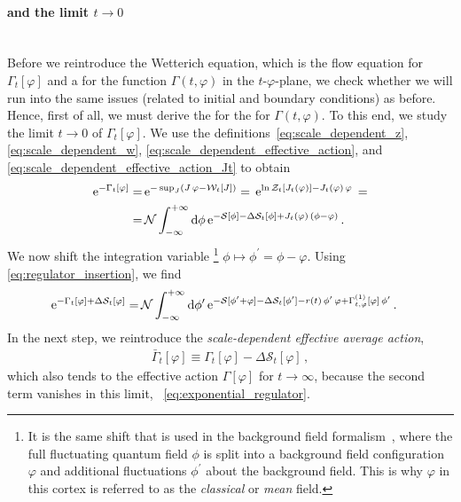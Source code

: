 \paragraph{\ic{} and the \uv{} limit $t\rightarrow 0$}\mbox{}\label{subsubsec:zerodICS} \\
Before we reintroduce the Wetterich equation, which is the flow equation for $\Gamma_t [ \varphi ]$ and a \pde{} for the function $\Gamma ( t, \varphi )$ in the $t$-$\varphi$-plane, we check whether we will run into the same issues (related to initial and boundary conditions) as before.
Hence, first of all, we must derive the \ic{} for the \pde{} for $\Gamma ( t, \varphi )$.
To this end, we study the limit $t \rightarrow 0$ of $\Gamma_t [ \varphi ]$.
We use the definitions~\eqref{eq:scale_dependent_z}, \eqref{eq:scale_dependent_w}, \eqref{eq:scale_dependent_effective_action}, and \eqref{eq:scale_dependent_effective_action_Jt} to obtain
\begin{subequations}\label{eq:derivation_uv_condition}
\begin{align}
	\eu^{ - \Gamma_t [ \varphi ] } = \, & \eu^{ - \mathop{\mathrm{sup}}_J ( J \, \varphi - \mathcal{W}_t [ J ] ) } =\, \eu^{ \ln \mathcal{Z}_t [ J_t ( \varphi )] - J_t ( \varphi ) \, \varphi }\, =
	\\* %
	= \, & \mathcal{N} \int_{-\infty}^{+\infty} \dif \phi \, \eu^{ - \mathcal{S} [ \phi ] - \Delta \mathcal{S}_t [ \phi ] + J_t ( \varphi ) \, ( \phi - \varphi ) } \, .
\end{align}
\end{subequations}
We now shift the integration variable%
\footnote{%
	It is the same shift that is used in the background field formalism~\cite{DeWitt:1965jb,Abbott:1981ke}, where the full fluctuating quantum field $\phi$ is split into a background field configuration $\varphi$ and additional fluctuations $\phi^\prime$ about the background field.
	This is why $\varphi$ in this cortex is referred to as the \textit{classical} or \textit{mean} field.
}
$\phi \mapsto \phi^\prime = \phi - \varphi$. Using \cref{eq:regulator_insertion}, we find
\begin{align}
	\eu^{- \Gamma_t [ \varphi ] + \Delta \mathcal{S}_t [ \varphi ]} =	 \, & \mathcal{N} \int_{-\infty}^{+\infty} \dif\phi^\prime \, \eu^{ - \mathcal{S} [ \phi^\prime + \varphi ] - \Delta \mathcal{S}_t [ \phi^\prime ] - r ( t ) \, \phi^\prime \, \varphi + \Gamma^{(1)}_{t, \varphi} [ \varphi ] \, \phi^\prime } \, .	\label{eq:derivation_uv_condition_3}
\end{align}
In the next step, we reintroduce the \textit{scale-dependent effective average action},
\begin{align}
	\bar{\Gamma}_t [ \varphi ] \equiv \Gamma_t [ \varphi ] - \Delta \mathcal{S}_t [ \varphi ] \, ,	\label{eq:scale_dependent_effective_average_action}
\end{align}
which also tends to the effective action $\Gamma [ \varphi ]$ for $t \rightarrow \infty$, because the second term vanishes in this limit, \cf{}~\cref{eq:exponential_regulator}.

